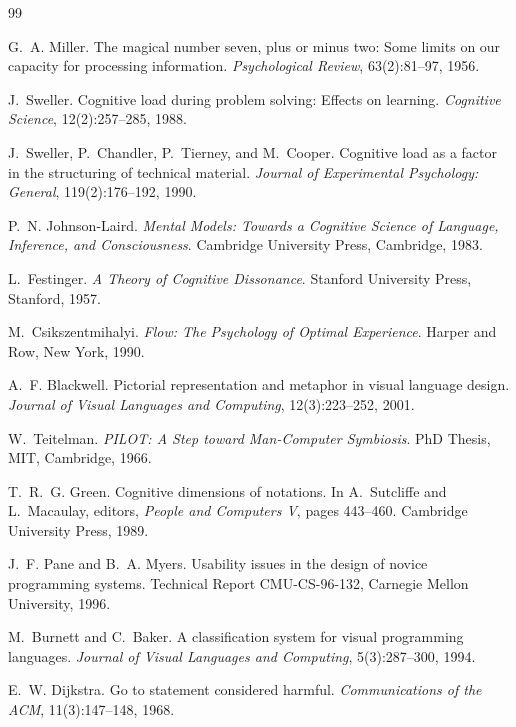 ﻿\documentclass[a4paper,12pt]{article}
\theoremstyle{definition}
\begin{document}
\begin{thebibliography}{99}

G.~A. Miller.
\newblock The magical number seven, plus or minus two: Some limits on our
  capacity for processing information.
\newblock \emph{Psychological Review}, 63(2):81--97, 1956.

J.~Sweller.
\newblock Cognitive load during problem solving: Effects on learning.
\newblock \emph{Cognitive Science}, 12(2):257--285, 1988.

J.~Sweller, P.~Chandler, P.~Tierney, and M.~Cooper.
\newblock Cognitive load as a factor in the structuring of technical material.
\newblock \emph{Journal of Experimental Psychology: General}, 119(2):176--192,
  1990.

P.~N. Johnson-Laird.
\newblock \emph{Mental Models: Towards a Cognitive Science of Language,
  Inference, and Consciousness}.
\newblock Cambridge University Press, Cambridge, 1983.

L.~Festinger.
\newblock \emph{A Theory of Cognitive Dissonance}.
\newblock Stanford University Press, Stanford, 1957.

M.~Csikszentmihalyi.
\newblock \emph{Flow: The Psychology of Optimal Experience}.
\newblock Harper and Row, New York, 1990.

A.~F. Blackwell.
\newblock Pictorial representation and metaphor in visual language design.
\newblock \emph{Journal of Visual Languages and Computing}, 12(3):223--252,
  2001.

W.~Teitelman.
\newblock \emph{PILOT: A Step toward Man-Computer Symbiosis}.
\newblock PhD Thesis, MIT, Cambridge, 1966.

T.~R.~G. Green.
\newblock Cognitive dimensions of notations.
\newblock In A.~Sutcliffe and L.~Macaulay, editors, \emph{People and Computers
  V}, pages 443--460. Cambridge University Press, 1989.

J.~F. Pane and B.~A. Myers.
\newblock Usability issues in the design of novice programming systems.
\newblock Technical Report CMU-CS-96-132, Carnegie Mellon University, 1996.

M.~Burnett and C.~Baker.
\newblock A classification system for visual programming languages.
\newblock \emph{Journal of Visual Languages and Computing}, 5(3):287--300,
  1994.

E.~W. Dijkstra.
\newblock Go to statement considered harmful.
\newblock \emph{Communications of the ACM}, 11(3):147--148, 1968.

\end{thebibliography}
\end{document}
